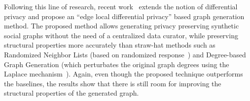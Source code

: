 Following this line of research, recent work~\cite{qin2017generating} extends the notion of differential privacy
and propose an ``edge local differential privacy'' based graph generation
method. The proposed method allows generating privacy preserving synthetic social
graphs without the need of a centralized data curator, while preserving structural
properties more accurately than straw-hat methods such as Randomized
Neighbor Lists (based on randomized response~\cite{dwork2014algorithmic}) and
Degree-based Graph Generation (which perturbates the original graph degrees
using the Laplace mechanism~\cite{dwork2009differential}). Again, even though the
proposed technique outperforms the baselines, the results show that there is
still room for improving the structural properties of the
generated graph.
